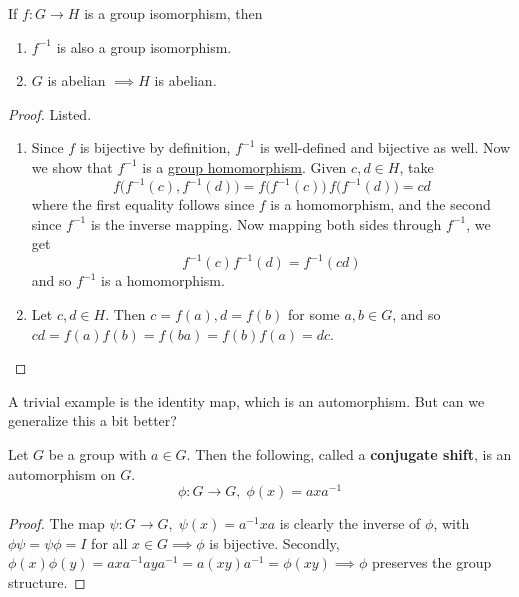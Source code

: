   \begin{theorem}
    \label{thm:properties-of-group-isomorphisms}
    If $f: G \to H$ is a group isomorphism, then 
    \begin{enumerate}
      \item $f^{-1}$ is also a group isomorphism. 
      \item $G$ is abelian $\implies H$ is abelian. 
    \end{enumerate} 
  \end{theorem}
  \begin{proof}
    Listed. 
    \begin{enumerate}
      \item Since $f$ is bijective by definition, $f^{-1}$ is well-defined and bijective as well. Now we show that $f^{-1}$ is a \hyperref[def:group-homomorphism]{group homomorphism}. Given $c, d \in H$, take 
      \begin{equation}
        f \big( f^{-1} (c), f^{-1} (d)\big) = f \big( f^{-1} (c) \big) \, f \big( f^{-1} (d) \big) = cd 
      \end{equation}
      where the first equality follows since $f$ is a homomorphism, and the second since $f^{-1}$ is the inverse mapping. Now mapping both sides through $f^{-1}$, we get 
      \begin{equation}
        f^{-1} (c) f^{-1} (d) = f^{-1} (cd)
      \end{equation}
      and so $f^{-1}$ is a homomorphism. 
      \item Let $c, d \in H$. Then $c = f(a), d = f(b)$ for some $a, b \in G$, and so $cd = f(a) f(b) = f(ba) = f(b) f(a) = dc$. 
    \end{enumerate}
  \end{proof}

  A trivial example is the identity map, which is an automorphism. But can we generalize this a bit better? 

  \begin{theorem}
    \label{thm:conjugate-shift-is-an-automorphism}
    Let $G$ be a group with $a \in G$. Then the following, called a \textbf{conjugate shift}, is an automorphism on $G$. 
    \begin{equation}
      \phi: G \to G, \; \phi (x) = a x a^{-1}
    \end{equation}
  \end{theorem}
  \begin{proof}
    The map $\psi: G \to G, \; \psi(x) = a^{-1} x a$ is clearly the inverse of $\phi$, with $\phi \psi = \psi \phi = I$ for all $x \in G \implies \phi$ is bijective. Secondly, $\phi(x) \phi(y) = a x a^{-1} a y a^{-1} = a (x y) a ^{-1} = \phi (x y) \implies \phi$ preserves the group structure. 
  \end{proof} 

